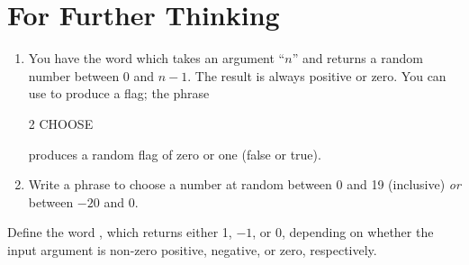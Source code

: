 \section{For Further Thinking}

\ifeightyfour\begin{enumerate}
\item
You have the word  which takes an argument ``$n$''
and returns a random number between 0 and $n-1$. The result is always
positive or zero.  You can use  to produce a flag; the
phrase
\begin{Code}
2 CHOOSE
\end{Code}
produces a random flag of zero or one (false or true).

\item
Write a phrase to choose a number at random between 0 and 19 (inclusive)
\emph{or} between $-20$ and 0.
\end{enumerate}\else
Define the word , which returns either 1,
$-1$, or 0, depending on whether the input argument is non-zero
positive, negative, or zero, respectively.
\fi
